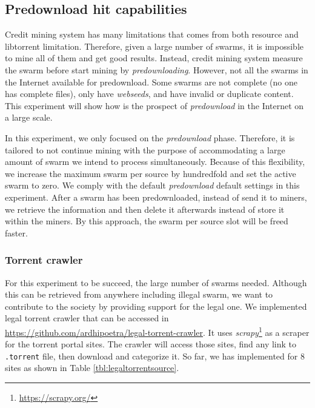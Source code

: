 
\subsection{Predownload hit capabilities}
\label{section:predlsetup}
Credit mining system has many limitations that comes from both resource and libtorrent limitation. Therefore, given a large number of swarms, it is impossible to mine all of them and get good results. Instead, credit mining system measure the swarm before start mining by \textit{predownloading}. However, not all the swarms in the Internet available for predownload. Some swarms are not complete (no one has complete files), only have \textit{webseeds}, and have invalid or duplicate content. This experiment will show how is the prospect of \textit{predownload} in the Internet on a large scale. 

In this experiment, we only focused on the \textit{predownload} phase. Therefore, it is tailored to not continue mining with the purpose of accommodating a large amount of swarm we intend to process simultaneously. Because of this flexibility, we increase the maximum swarm per source by hundredfold and set the active swarm to zero. We comply with the default \textit{predownload} default settings in this experiment. After a swarm has been predownloaded, instead of send it to miners, we retrieve the information and then delete it afterwards instead of store it within the miners. By this approach, the swarm per source slot will be freed faster. 

\subsubsection{Torrent crawler}
For this experiment to be succeed, the large number of swarms needed. Although this can be retrieved from anywhere including illegal swarm, we want to contribute to the society by providing support for the legal one. We implemented legal torrent crawler that can be accessed in \url{https://github.com/ardhipoetra/legal-torrent-crawler}. It uses \textit{scrapy}\footnote{\url{https://scrapy.org/}} as a scraper for the torrent portal sites. The crawler will access those sites, find any link to \texttt{.torrent} file, then download and categorize it. So far, we has implemented for 8 sites as shown in Table \ref{tbl:legaltorrentsource}.

